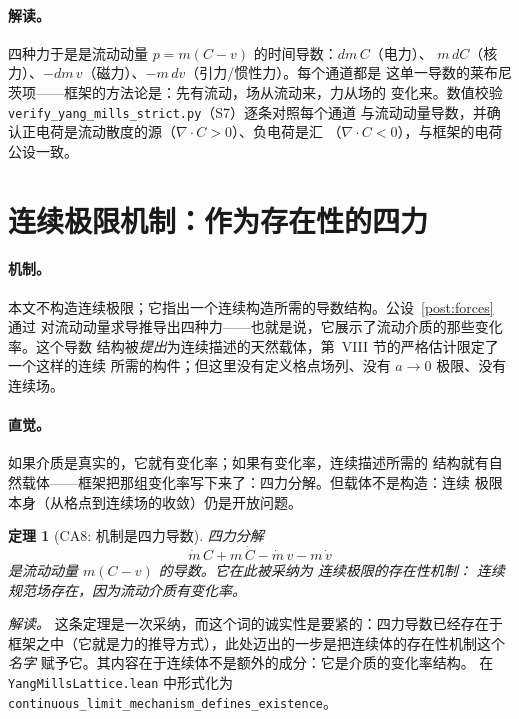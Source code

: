 \documentclass[aps,prd,preprint,superscriptaddress,amsmath,amssymb]{revtex4-2}
\newtheorem{theorem}{定理}[section]
\begin{document}
\paragraph{解读。} 四种力于是是流动动量 $p=m(C-v)$ 的时间导数：$dm\,C$（电力）、
$m\,dC$（核力）、$-dm\,v$（磁力）、$-m\,dv$（引力/惯性力）。每个通道都是
这单一导数的莱布尼茨项——框架的方法论是：先有流动，场从流动来，力从场的
变化来。数值校验 \texttt{verify\_yang\_mills\_strict.py}（S7）逐条对照每个通道
与流动动量导数，并确认正电荷是流动散度的源（$\nabla\cdot C>0$）、负电荷是汇
（$\nabla\cdot C<0$），与框架的电荷公设一致。

\section{连续极限机制：作为存在性的四力}
\label{sec:continuum}

\paragraph{机制。}
本文不构造连续极限；它指出一个连续构造所需的导数结构。公设~\ref{post:forces} 通过
对流动动量求导推导出四种力——也就是说，它展示了流动介质的那些变化率。这个导数
结构被\emph{提出}为连续描述的天然载体，第~VIII 节的严格估计限定了一个这样的连续
所需的构件；但这里没有定义格点场列、没有 $a\to0$ 极限、没有连续场。

\paragraph{直觉。} 如果介质是真实的，它就有变化率；如果有变化率，连续描述所需的
结构就有自然载体——框架把那组变化率写下来了：四力分解。但载体不是构造：连续
极限本身（从格点到连续场的收敛）仍是开放问题。

\begin{theorem}[CA8: 机制是四力导数]
\label{thm:ca8}
四力分解
\begin{equation}
\dot m\,C + m\,\dot C - \dot m\,v - m\,\dot v
\end{equation}
是流动动量 $m(C-v)$ 的导数。它在此被采纳为 \emph{连续极限的存在性机制}：
连续规范场存在，因为流动介质有变化率。
\end{theorem}

\emph{解读。} 这条定理是一次采纳，而这个词的诚实性是要紧的：四力导数已经存在于
框架之中（它就是力的推导方式），此处迈出的一步是把连续体的存在性机制这个
\emph{名字} 赋予它。其内容在于连续体不是额外的成分：它是介质的变化率结构。
在 \texttt{YangMillsLattice.lean} 中形式化为
\texttt{continuous\_limit\_}\allowbreak\texttt{mechanism\_}\allowbreak\texttt{defines\_existence}。
\end{document}
